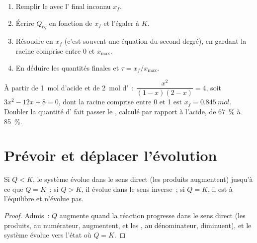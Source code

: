 \begin{method}\label{met:g12:equilibrium:final}
\begin{enumerate}
  \item Remplir le  avec l' final inconnu
        $x_f$.
  \item Écrire $Q_{eq}$ en fonction de $x_f$ et l'égaler à $K$.
  \item Résoudre en $x_f$ (c'est souvent une équation du second degré),
        en gardant la racine comprise entre 0 et $x_{\max}$.
  \item En déduire les quantités finales et $\tau = x_f/x_{\max}$.
\end{enumerate}
\end{method}

\begin{example}\label{ex:g12:equilibrium:excess}
À partir de \qty{1}{mol} d'acide et de \qty{2}{mol} d'~:
$\dfrac{x^2}{(1-x)(2-x)} = 4$, soit $3x^2 - 12x + 8 = 0$, dont la racine
comprise entre 0 et 1 est $x_f = \qty{0.845}{mol}$. Doubler la quantité
d' fait passer le , calculé par rapport à l'acide, de
\qty{67}{\percent} à
\qty{85}{\percent}.
\end{example}

\section{Prévoir et déplacer l'évolution}

\begin{proposition}\label{prop:g12:equilibrium:direction}
Si $Q < K$, le système évolue dans le sens direct (les produits
augmentent) jusqu'à ce que $Q = K$~; si $Q > K$, il évolue dans le sens
inverse~;
si $Q = K$, il est à l'équilibre et n'évolue pas.
\end{proposition}

\begin{proof}
Admis~: $Q$ augmente quand la réaction progresse dans le sens direct
(les produits, au numérateur, augmentent, et les , au
dénominateur, diminuent), et le système évolue vers l'état où $Q = K$.
\end{proof}

